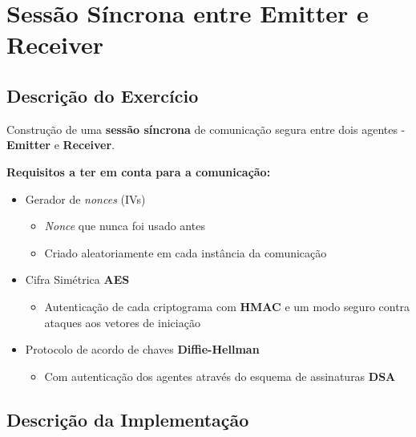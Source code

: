 \documentclass[12pt]{report}
\providecommand{\tightlist}{%
      \setlength{\itemsep}{0pt}\setlength{\parskip}{0pt}}
\begin{document}
   
    \newpage
	  \hypersetup{linkcolor=black}
\vfill

	\tableofcontents
\vfill

	\newpage


    \hypertarget{sessuxe3o-suxedncrona-entre-emitter-e-receiver}{%
\section{Sessão Síncrona entre Emitter e
Receiver}\label{sessuxe3o-suxedncrona-entre-emitter-e-receiver}}
\bigskip
\hypertarget{descriuxe7uxe3o-do-exercuxedcio}{%
\subsection{Descrição do
Exercício}\label{descriuxe7uxe3o-do-exercuxedcio}}

Construção de uma \textbf{sessão síncrona} de comunicação segura entre
dois agentes - \textbf{Emitter} e \textbf{Receiver}.

\textbf{Requisitos a ter em conta para a comunicação:}

\begin{itemize}
\tightlist
\item
  Gerador de \emph{nonces} (IVs)

  \begin{itemize}
  \tightlist
  \item
    \emph{Nonce} que nunca foi usado antes
  \item
    Criado aleatoriamente em cada instância da comunicação
  \end{itemize}
\item
  Cifra Simétrica \textbf{AES}

  \begin{itemize}
  \tightlist
  \item
    Autenticação de cada criptograma com \textbf{HMAC} e um modo seguro
    contra ataques aos vetores de iniciação
  \end{itemize}
\item
  Protocolo de acordo de chaves \textbf{Diffie-Hellman}

  \begin{itemize}
  \tightlist
  \item
    Com autenticação dos agentes através do esquema de assinaturas
    \textbf{DSA}
  \end{itemize}
\end{itemize}
\bigskip
\hypertarget{descriuxe7uxe3o-da-implementauxe7uxe3o}{%
\subsection{Descrição da
Implementação}\label{descriuxe7uxe3o-da-implementauxe7uxe3o}}
\end{document}
